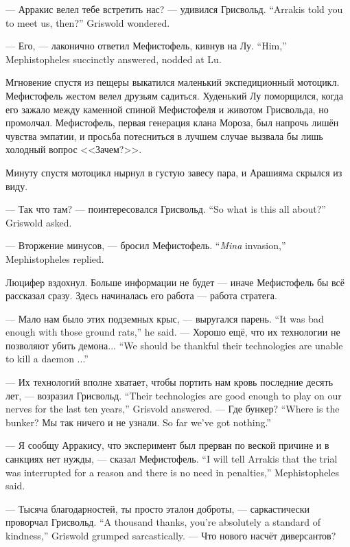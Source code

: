 {--- Арракис велел тебе встретить нас? --- удивился Грисвольд.}
{``Arrakis told you to meet us, then?'' Griswold wondered.}

{--- Его, --- лаконично ответил Мефистофель, кивнув на Лу.}
{``Him,'' Mephistopheles succinctly answered, nodded at Lu.}

Мгновение спустя из пещеры выкатился маленький экспедиционный мотоцикл.
Мефистофель жестом велел друзьям садиться.
Худенький Лу поморщился, когда его зажало между каменной спиной Мефистофеля и животом Грисвольда, но промолчал.
Мефистофель, первая генерация клана Мороза, был напрочь лишён чувства эмпатии, и просьба потесниться в лучшем случае вызвала бы лишь холодный вопрос <<Зачем?>>.

Минуту спустя мотоцикл нырнул в густую завесу пара, и Арашияма скрылся из виду.

{--- Так что там? --- поинтересовался Грисвольд.}
{``So what is this all about?'' Griswold asked.}

{--- Вторжение минусов, --- бросил Мефистофель.}
{``\textit{Mina} invasion,'' Mephistopheles replied.}

Люцифер вздохнул.
Больше информации не будет --- иначе Мефистофель бы всё рассказал сразу.
Здесь начиналась его работа --- работа стратега.

{--- Мало нам было этих подземных крыс, --- выругался парень.}
{``It was bad enough with those ground rats,'' he said.}
{--- Хорошо ещё, что их технологии не позволяют убить демона...}
{``We should be thankful their technologies are unable to kill a daemon ...''}

{--- Их технологий вполне хватает, чтобы портить нам кровь последние десять лет, --- возразил Грисвольд.}
{``Their technologies are good enough to play on our nerves for the last ten years,'' Grisvold answered.}
{--- Где бункер?}
{``Where is the bunker?}
{Мы так ничего и не узнали.}
{So far we've got nothing.''}

{--- Я сообщу Арракису, что эксперимент был прерван по веской причине и в санкциях нет нужды, --- сказал Мефистофель.}
{``I will tell Arrakis that the trial was interrupted for a reason and there is no need in penalties,'' Mephistopheles said.}

{--- Тысяча благодарностей, ты просто эталон доброты, --- саркастически проворчал Грисвольд.}
{``A thousand thanks, you're absolutely a standard of kindness,'' Griswold grumped sarcastically.}
--- Что нового насчёт диверсантов?

